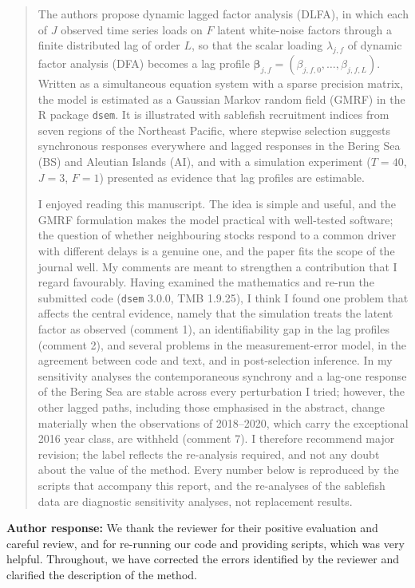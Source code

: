 \documentclass[11pt]{article}
\begin{document}
\begin{quote}
The authors propose dynamic lagged factor analysis (DLFA), in which each
of \(J\) observed time series loads on \(F\) latent white-noise factors
through a finite distributed lag of order \(L\), so that the scalar
loading \(\lambda_{j,f}\) of dynamic factor analysis (DFA) becomes a lag
profile
\(\boldsymbol{\beta}_{j,f} = (\beta_{j,f,0}, \dots, \beta_{j,f,L})\).
Written as a simultaneous equation system with a sparse precision
matrix, the model is estimated as a Gaussian Markov random field (GMRF)
in the R package \texttt{dsem}. It is illustrated with sablefish
recruitment indices from seven regions of the Northeast Pacific, where
stepwise selection suggests synchronous responses everywhere and lagged
responses in the Bering Sea (BS) and Aleutian Islands (AI), and with a
simulation experiment (\(T = 40\), \(J = 3\), \(F = 1\)) presented as
evidence that lag profiles are estimable.

I enjoyed reading this manuscript. The idea is simple and useful, and
the GMRF formulation makes the model practical with well-tested
software; the question of whether neighbouring stocks respond to a
common driver with different delays is a genuine one, and the paper fits
the scope of the journal well. My comments are meant to strengthen a
contribution that I regard favourably. Having examined the mathematics
and re-run the submitted code (\texttt{dsem} 3.0.0, TMB 1.9.25), I think
I found one problem that affects the central evidence, namely that the
simulation treats the latent factor as observed (comment 1), an
identifiability gap in the lag profiles (comment 2), and several
problems in the measurement-error model, in the agreement between code
and text, and in post-selection inference. In my sensitivity analyses
the contemporaneous synchrony and a lag-one response of the Bering Sea
are stable across every perturbation I tried; however, the other lagged
paths, including those emphasised in the abstract, change materially
when the observations of 2018--2020, which carry the exceptional 2016
year class, are withheld (comment 7). I therefore recommend major
revision; the label reflects the re-analysis required, and not any doubt
about the value of the method. Every number below is reproduced by the
scripts that accompany this report, and the re-analyses of the sablefish
data are diagnostic sensitivity analyses, not replacement results.
\end{quote}

\textbf{Author response:} We thank the reviewer for their positive
evaluation and careful review, and for re-running our code and providing
scripts, which was very helpful. Throughout, we have corrected the errors identified by the reviewer and clarified
the description of the method.
\end{document}

